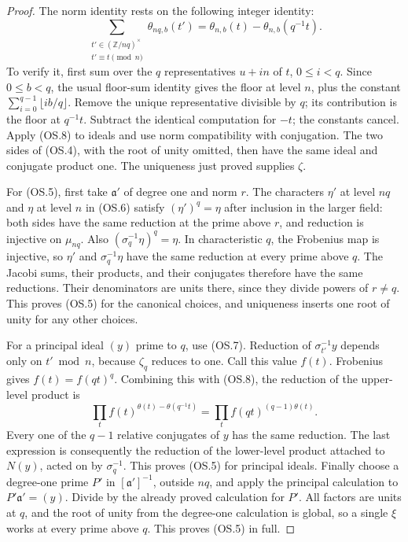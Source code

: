 \begin{proof}
The norm identity rests on the following integer identity:
\[
 \sum_{\substack{t'\in(\mathbb Z/nq)^\times\\t'\equiv t\pmod n}}
 \theta_{nq,b}(t')
       =\theta_{n,b}(t)-\theta_{n,b}(q^{-1}t).
 \tag{OS.8}
\]
To verify it, first sum over the $q$ representatives $u+in$ of $t$,
$0\le i<q$.  Since $0\le b<q$, the usual floor-sum identity gives
the floor at level $n$, plus the constant
$\sum_{i=0}^{q-1}\lfloor ib/q\rfloor$.
Remove the unique representative divisible by $q$; its contribution
is the floor at $q^{-1}t$.  Subtract the identical computation for
$-t$; the constants cancel.  Apply (OS.8) to ideals and use norm
compatibility with conjugation.  The two sides of (OS.4), with the
root of unity omitted, then have the same ideal and conjugate product
one.  The uniqueness just proved supplies $\zeta$.

For (OS.5), first take $\mathfrak a'$ of degree one and norm $r$.
The characters $\eta'$ at level $nq$ and $\eta$ at level $n$ in
(OS.6) satisfy $(\eta')^q=\eta$ after inclusion in the larger field:
both sides have the same reduction at the prime above $r$, and
reduction is injective on $\mu_{nq}$.  Also
$(\sigma_q^{-1}\eta)^q=\eta$.  In characteristic $q$, the Frobenius
map is injective, so $\eta'$ and $\sigma_q^{-1}\eta$ have the same
reduction at every prime above $q$.  The Jacobi sums, their products,
and their conjugates therefore have the same reductions.  Their
denominators are units there, since they divide powers of $r\ne q$.
This proves (OS.5) for the canonical choices, and uniqueness inserts
one root of unity for any other choices.

For a principal ideal $(y)$ prime to $q$, use (OS.7).
Reduction of $\sigma_{t'}^{-1}y$ depends only on $t'\bmod n$,
because $\zeta_q$ reduces to one.  Call this value $f(t)$.
Frobenius gives $f(t)=f(qt)^q$.  Combining this with (OS.8), the
reduction of the upper-level product is
\[
 \prod_t f(t)^{\theta(t)-\theta(q^{-1}t)}
   =\prod_t f(qt)^{(q-1)\theta(t)}.
\]
Every one of the $q-1$ relative conjugates of $y$ has the same
reduction.  The last expression is consequently the reduction of
the lower-level product attached to $N(y)$, acted on by
$\sigma_q^{-1}$.  This proves (OS.5) for principal ideals.
Finally choose a degree-one prime $P'$ in $[\mathfrak a']^{-1}$,
outside $nq$, and apply the principal calculation to
$P'\mathfrak a'=(y)$.  Divide by the already proved calculation
for $P'$.  All factors are units at $q$, and the root of unity from
the degree-one calculation is global, so a single $\xi$ works at
every prime above $q$.  This proves (OS.5) in full.
\end{proof}

